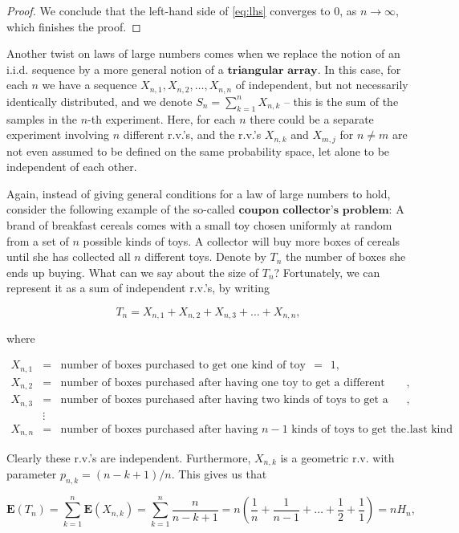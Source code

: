 \documentclass[11pt]{report}
\theoremstyle{plain}
\theoremstyle{definition}
\begin{document}
\begin{proof}
\noindent We conclude that the left-hand side of \eqref{eq:lhs}
converges to 0, as $n\to\infty$, which finishes the
proof.
\end{proof}

\noindent Another twist on laws of large numbers comes when we
replace the notion of an i.i.d. sequence by a more
general notion of a $\textbf{triangular array}$. In
this case, for each $n$ we have a sequence
$X_{n,1},X_{n,2},\ldots,X_{n,n}$ of independent, but
not necessarily identically distributed, and we denote
$S_n=\sum_{k=1}^n X_{n,k}$ -- this is the sum of the
samples in the $n$-th experiment. Here, for each $n$
there could be a separate experiment involving $n$
different r.v.'s, and the r.v.'s $X_{n,k}$ and
$X_{m,j}$ for $n\neq m$ are not even assumed to be
defined on the same probability space, let alone to be
independent of each other.

Again, instead of giving general conditions for a law
of large numbers to hold, consider the following
example of the so-called
$\textbf{coupon collector's problem}$: A brand of
breakfast cereals comes with a small toy chosen
uniformly at random from a set of $n$ possible kinds
of toys. A collector will buy more boxes of cereals
until she has collected all $n$ different toys.
Denote by $T_n$ the number of boxes she ends up
buying. What can we say about the size of $T_n$?
Fortunately, we can represent it as a sum of
independent r.v.'s, by writing

\[
T_n = X_{n,1} + X_{n,2} + X_{n,3} + \ldots + X_{n,n},
\]

\noindent where

\begin{eqnarray*}
X_{n,1} &=& \textrm{number of boxes purchased to get one kind of toy} \ \ =\ \ 1, \\
X_{n,2} &=& \textrm{number of boxes purchased after having one toy to get a different kind}, \\
X_{n,3} &=& \textrm{number of boxes purchased after having two kinds of toys to get a third kind}, \\
& \vdots&  \\
X_{n,n} &=& \textrm{number of boxes purchased after having $n-1$ kinds of toys to get the last kind}.
\end{eqnarray*}

\noindent Clearly these r.v.'s are independent. Furthermore,
$X_{n,k}$ is a geometric r.v. with parameter
$p_{n,k} = (n-k+1)/n$. This gives us that

\[
\mathbf{E}(T_n) = \sum_{k=1}^n \mathbf{E}(X_{n,k}) = \sum_{k=1}^n \frac{n}{n-k+1} = n\left(\frac{1}{n}+\frac{1}{n-1}+\ldots+\frac{1}{2}+\frac{1}{1}\right) = n H_n,
\]
\end{document}
